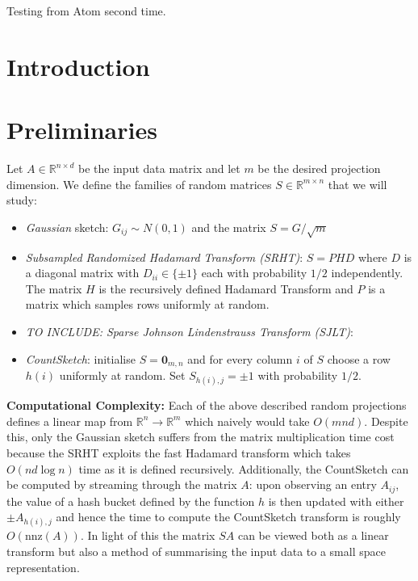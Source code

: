 \documentclass[twoside]{article}
\newcommand{\R}{\mathbb{R}}
\newcommand{\nnz}[1]{\text{nnz}(#1)}
\theoremstyle{definition}\newtheorem{thm}{Theorem}[section]
\theoremstyle{definition}\newtheorem{mydef}[thm]{Definition}
\theoremstyle{definition}\newtheorem{rem}[thm]{Remark}
\theoremstyle{definition}\newtheorem{prop}[thm]{Proposition}
\theoremstyle{definition}\newtheorem{example}[thm]{Example}
\theoremstyle{definition}\newtheorem{claim}[thm]{Claim}
\theoremstyle{definition}\newtheorem{Qu}[thm]{Question}
\theoremstyle{definition}\newtheorem{Lemma}[thm]{Lemma}
\theoremstyle{definition}\newtheorem{Cor}[thm]{Corollary}
\theoremstyle{definition}\newtheorem{Fact}[]{Fact}
\begin{document}
Testing from Atom second time.

\section{Introduction} \label{sec: intro}



\section{Preliminaries} \label{sec: preliminaries}

Let $A \in \R^{n \times d}$ be the input data matrix and let $m$ be the
desired projection dimension.
We define the families of random matrices $S \in \R^{m \times n}$ that we will
study:
\begin{itemize}
  \item \textit{Gaussian} sketch: $G_{ij} \sim N(0,1)$ and the matrix
  $S = G/\sqrt{m}$
  \item \textit{Subsampled Randomized Hadamard Transform (SRHT)}: $S = PHD$
  where $D$ is a diagonal matrix with $D_{ii} \in \{ \pm 1 \}$ each with
  probability $1/2$ independently.
  The matrix $H$ is the recursively defined Hadamard Transform and $P$ is
  a matrix
  which samples rows uniformly at random.
  \item{\textit{TO INCLUDE: Sparse Johnson Lindenstrauss Transform (SJLT)}:}
  \item \textit{CountSketch}: initialise $S = \mathbf{0}_{m,n}$ and for every
  column $i$ of $S$ choose a row $h(i)$ uniformly at random.
  Set $S_{h(i),j} = \pm 1$ with probability $1/2$.
\end{itemize}

\textbf{Computational Complexity:}
Each of the above described random projections defines a linear map from $\R^n
\to \R^m$ which naively would take $O(mnd)$.
Despite this, only the Gaussian sketch suffers from the matrix multiplication
time cost because the SRHT exploits the fast Hadamard transform which takes
$O(nd \log n)$ time as it is defined recursively.
Additionally, the CountSketch can be computed by streaming through the matrix
$A$: upon observing an entry $A_{ij}$, the value of a hash bucket defined
by the function $h$ is then updated with either $\pm A_{h(i),j}$ and hence
the time
to compute the CountSketch transform is roughly $O(\nnz{A})$.
In light of this the matrix $SA$ can be viewed both as a linear transform but
also a method of summarising the input data to a small space representation.
\end{document}
